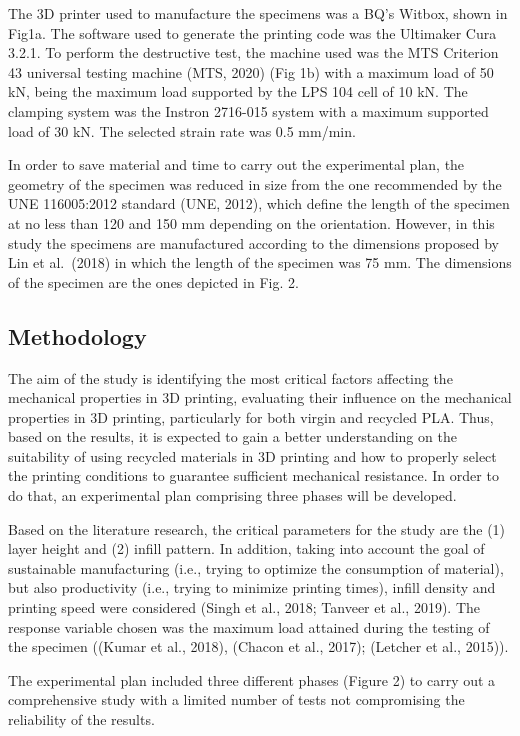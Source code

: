 \documentclass[]{elsarticle} %
\begin{document}
The 3D printer used to manufacture the specimens was a BQ's Witbox,
shown in Fig1a. The software used to generate the printing code was the
Ultimaker Cura 3.2.1. To perform the destructive test, the machine used
was the MTS Criterion 43 universal testing machine (MTS, 2020) (Fig 1b)
with a maximum load of 50 kN, being the maximum load supported by the
LPS 104 cell of 10 kN. The clamping system was the Instron 2716-015
system with a maximum supported load of 30 kN. The selected strain rate
was 0.5 mm/min.

In order to save material and time to carry out the experimental plan,
the geometry of the specimen was reduced in size from the one
recommended by the UNE 116005:2012 standard (UNE, 2012), which define
the length of the specimen at no less than 120 and 150 mm depending on
the orientation. However, in this study the specimens are manufactured
according to the dimensions proposed by Lin et al.~(2018) in which the
length of the specimen was 75 mm. The dimensions of the specimen are the
ones depicted in Fig. 2.

\hypertarget{methodology}{%
\subsection{Methodology}\label{methodology}}

The aim of the study is identifying the most critical factors affecting
the mechanical properties in 3D printing, evaluating their influence on
the mechanical properties in 3D printing, particularly for both virgin
and recycled PLA. Thus, based on the results, it is expected to gain a
better understanding on the suitability of using recycled materials in
3D printing and how to properly select the printing conditions to
guarantee sufficient mechanical resistance. In order to do that, an
experimental plan comprising three phases will be developed.

Based on the literature research, the critical parameters for the study
are the (1) layer height and (2) infill pattern. In addition, taking
into account the goal of sustainable manufacturing (i.e., trying to
optimize the consumption of material), but also productivity (i.e.,
trying to minimize printing times), infill density and printing speed
were considered (Singh et al., 2018; Tanveer et al., 2019). The response
variable chosen was the maximum load attained during the testing of the
specimen ((Kumar et al., 2018), (Chacon et al., 2017); (Letcher et al.,
2015)).

The experimental plan included three different phases (Figure 2) to
carry out a comprehensive study with a limited number of tests not
compromising the reliability of the results.
\end{document}
